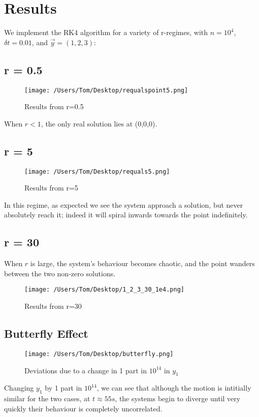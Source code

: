 \documentclass[a4paper,11pt]{article}
\begin{document}
\section{Results}
We implement the RK4 algorithm for a variety of r-regimes, with $n = 10^4$, $\delta t = 0.01$, and $\vec{y} = (1,2,3)$:
\subsection*{r = 0.5}
\begin{figure}[h!]
  \texttt{[image: /Users/Tom/Desktop/requalspoint5.png]}
  \caption{Results from r=0.5}
  \label{fig:graph1}
\end{figure}
When $r<1$, the only real solution lies at (0,0,0). 
\subsection*{r = 5}
\begin{figure}
  \texttt{[image: /Users/Tom/Desktop/requals5.png]}
  \caption{Results from r=5}
  \label{fig:graph1}
\end{figure}
In this regime, as expected we see the system approach a solution, but never absolutely reach it; indeed it will spiral inwards towards the point indefinitely. 
\subsection*{r = 30}
When $r$ is large, the system's behaviour becomes chaotic, and the point wanders between the two non-zero solutions. 
\begin{figure}[h!]
  \texttt{[image: /Users/Tom/Desktop/1\_2\_3\_30\_1e4.png]}
  \caption{Results from r=30}
  \label{fig:graph1}
\vspace{10mm}
\end{figure}
\subsection*{Butterfly Effect}
\begin{figure}[h!]
  \texttt{[image: /Users/Tom/Desktop/butterfly.png]}
  \caption{Deviations due to a change in 1 part in $10^{14}$ in $y_1$}
  \label{fig:graph1}
\end{figure}
Changing $y_1$ by 1 part in $10^{14}$, we can see that although the motion is intitially similar for the two cases, at $t \approx 55 s$, the systems begin to diverge until very quickly their behaviour is completely uncorrelated. 
\end{document}

